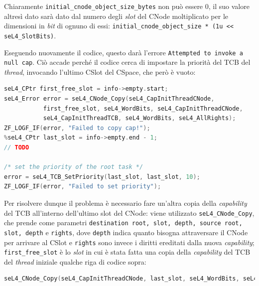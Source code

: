 Chiaramente \texttt{initial\_cnode\_object\_size\_bytes} non può essere 0, il suo valore altresì dato sarà dato dal numero degli \textit{slot} del CNode moltiplicato per le dimensioni in \textit{bit} di ognuno di essi: \texttt{initial\_cnode\_object\_size * (1u << seL4\_SlotBits)}.

Eseguendo nuovamente il codice, questo darà l'errore \texttt{Attempted to invoke a null cap}. Ciò accade perché il codice cerca di impostare la priorità del TCB del \textit{thread}, invocando l'ultimo CSlot del CSpace, che però è vuoto:
\begin{lstlisting}[language=C++]
seL4_CPtr first_free_slot = info->empty.start;
seL4_Error error = seL4_CNode_Copy(seL4_CapInitThreadCNode, 
           first_free_slot, seL4_WordBits, seL4_CapInitThreadCNode,
           seL4_CapInitThreadTCB, seL4_WordBits, seL4_AllRights);
ZF_LOGF_IF(error, "Failed to copy cap!");
%seL4_CPtr last_slot = info->empty.end - 1;
// TODO

/* set the priority of the root task */
error = seL4_TCB_SetPriority(last_slot, last_slot, 10);
ZF_LOGF_IF(error, "Failed to set priority");
\end{lstlisting}

Per risolvere dunque il problema è necessario fare un'altra copia della \textit{capability} del TCB all'interno dell'ultimo slot del CNode: viene utilizzato \texttt{seL4\_CNode\_Copy}, che prende come parametri \texttt{destination root, slot, depth, source root, slot, depth} e \texttt{rights}, dove \texttt{depth} indica quanto bisogna attraversare il CNode per arrivare al CSlot e \texttt{rights} sono invece i diritti ereditati dalla nuova \textit{capability}; \texttt{first\_free\_slot} è lo \textit{slot} in cui è stata fatta una copia della \textit{capability} del TCB del \textit{thread} iniziale qualche riga di codice sopra:
\begin{lstlisting}[language=C++]
seL4_CNode_Copy(seL4_CapInitThreadCNode, last_slot, seL4_WordBits, seL4_CapInitThreadCNode, first_free_slot, seL4_WordBits, seL4_AllRights);
\end{lstlisting}

